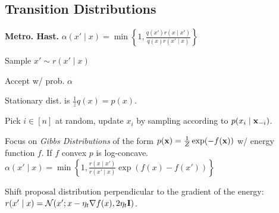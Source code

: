 \subsection{Transition Distributions}

\begin{colored}
    \textbf{Metro. Hast.} \(\alpha(x'\mid x) = \min\left\{1, \frac{q(x') r(x\mid x')}{q(x) r(x' \mid x)}\right\}\)
    \begin{enumerate*}
        \item Sample \(x' \sim r(x' \mid x)\)
        \item Accept w/ prob. \(\alpha\)
    \end{enumerate*}
    Stationary dist. is \(\frac{1}{z}q(x) = p(x)\).
\end{colored}

\begin{definition}
    Pick \(i \in [n]\) at random, update \(x_i\) by sampling according to \(p(x_i \mid \vb{x}_{-i})\).
\end{definition}

\begin{definition}
    Focus on \textit{Gibbs Distributions} of the form \(p(\vb{x}) = \frac{1}{Z}\exp(-f(\vb{x}))\) w/ energy function \(f\). If \(f\) convex \(p\) is log-concave.
    \(\alpha(x'\mid x) = \min \left\{1, \frac{r(x \mid x')}{r(x' \mid x)} \exp(f(x) - f(x'))\right\}\)
\end{definition}

\begin{definition}
    Shift proposal distribution perpendicular to the gradient of the energy:
    \(r(x' \mid x) = \operatorname{\mathcal{N}}(x'; x - \eta_t \nabla f(x), 2\eta_t \vb{I})\).
\end{definition}

